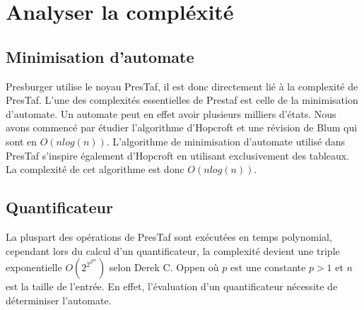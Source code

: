 \section{Analyser la compléxité}

\subsection{Minimisation d'automate}

Presburger utilise le noyau PresTaf, il est donc directement lié à la complexité de PresTaf. L'une des complexités essentielles de Prestaf est celle de la minimisation d'automate. Un automate peut en effet avoir plusieurs milliers d'états. Nous avons commencé par étudier l'algorithme d'Hopcroft et une révision de Blum qui sont en $O(nlog(n))$. L'algorithme de minimisation d'automate utilisé dans PresTaf s'inspire également d'Hopcroft en utilisant exclusivement des tableaux. La complexité de cet algorithme est donc $O(nlog(n))$. 

\subsection{Quantificateur}

La pluspart des opérations de PresTaf sont exécutées en temps polynomial, cependant lors du calcul d'un quantificateur, la complexité devient une triple exponentielle $O(2^{2^{2^{pn}}})$ selon Derek C. Oppen\cite{oppen1978222pn} où $p$ est une constante $p > 1$ et $n$ est la taille de l'entrée. En effet, l'évaluation d'un quantificateur nécessite de déterminiser l'automate.

